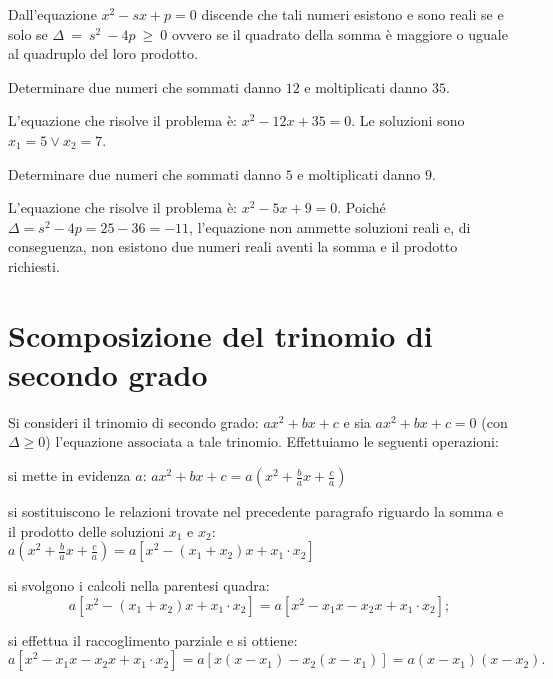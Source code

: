 Dall'equazione \(x^{2} - s x + p = 0\) discende che tali numeri esistono e sono 
reali se e solo se \(\Delta~=~s^{2}~-4p~\geq~0\) ovvero se il quadrato della 
somma 
è maggiore o uguale al quadruplo del loro prodotto.

\begin{esempio}
Determinare due numeri che sommati danno \(12\) e moltiplicati danno \(35\).

L'equazione che risolve il problema è: \(x^{2} - 12 x + 35 = 0\). Le soluzioni 
sono \(x_{1} = 5 \vee x_{2} = 7\).
\end{esempio}

\begin{esempio}
Determinare due numeri che sommati danno \(5\) e moltiplicati danno \(9\).

L'equazione che risolve il problema è: \(x^{2} - 5 x + 9 = 0\). Poiché \(\Delta = 
s^{2} - 4 p = 25 - 36 = - 11\), l'equazione non ammette soluzioni reali e, di 
conseguenza, non esistono due numeri reali aventi la somma e il prodotto 
richiesti.
\end{esempio}

\section{Scomposizione del trinomio di secondo grado}
\label{sec:eq2gr_scomposizione_trinomio}

Si consideri il trinomio di secondo grado: \(a x^{2} + b x + c\) e sia \(a x^{2} + 
b x + c = 0\) (con \(\Delta \geq 0\)) l'equazione associata a tale trinomio. 
Effettuiamo le seguenti operazioni:
\begin{itemize*}
\item si mette in evidenza \(a\): \(a x^{2} + b x + c = a \left( x^{2} + 
\frac{b}{a} x + \frac{c}{a} \right)\)
\item si sostituiscono le relazioni trovate nel precedente paragrafo riguardo 
la 
somma e il prodotto delle soluzioni \(x_{1}\) e \(x_{2}\): \(a \left( x^{2} + 
\frac{b}{a} x + \frac{c}{a} \right) = a \left[x^{2} - ( x_{1} + x_{2} ) x + 
x_{1} \cdot x_{2} \right]\)
\item si svolgono i calcoli nella parentesi quadra:
\[a \left[ x^{2} - ( x_{1} + x_{2} ) x + x_{1} \cdot x_{2}\right] = a\left[ 
x^{2} - x_{1} x - x_{2} x + x_{1} \cdot x_{2}\right];\]
\item si effettua il raccoglimento parziale e si ottiene:
\[a \left[x^{2} - x_{1} x - x_{2} x + x_{1} \cdot x_{2}\right] = a \left[ {x 
\left(x - x_{1} \right) - x_{2} \left( x - x_{1}\right)}\right] = a \left( x - 
x_{1} \right) \left( x - x_{2} \right).\]
\end{itemize*}

